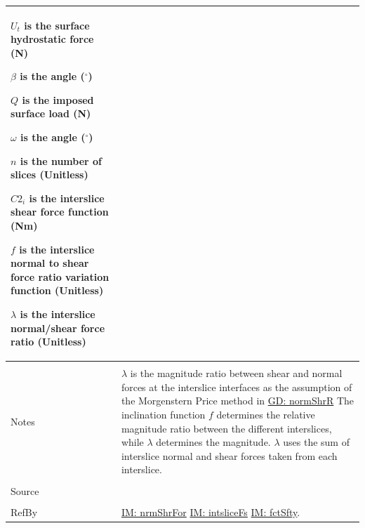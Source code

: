 \documentclass[12pt]{article}
\begin{document}
\begin{minipage}{\textwidth}
\begin{tabular}{p{} p{}}
\begin{symbDescription}
                                                                                           \item{${U_{t}}$ is the surface hydrostatic force (N)}
                                                                                           \item{$β$ is the angle (${}^{\circ}$)}
                                                                                           \item{$Q$ is the imposed surface load (N)}
                                                                                           \item{$ω$ is the angle (${}^{\circ}$)}
                                                                                           \item{$n$ is the number of slices (Unitless)}
                                                                                           \item{${C2_{i}}$ is the interslice shear force function (Nm)}
                                                                                           \item{$f$ is the interslice normal to shear force ratio variation function (Unitless)}
                                                                                           \item{$λ$ is the interslice normal/shear force ratio (Unitless)}
                                                                                           \end{symbDescription}
                                                                                           \\ \midrule \\
                                                                                           Notes & $λ$ is the magnitude ratio between shear and normal forces at the interslice interfaces as the assumption of the Morgenstern Price method in \hyperref[GD:normShrR]{GD: normShrR} The inclination function $f$ determines the relative magnitude ratio between the different interslices, while $λ$ determines the magnitude. $λ$ uses the sum of interslice normal and shear forces taken from each interslice.
                                                                                                   \\ \midrule \\
                                                                                                   Source & \cite{chen2005}
                                                                                                            \\ \midrule \\
                                                                                                            RefBy & \hyperref[IM:nrmShrFor]{IM: nrmShrFor} \hyperref[IM:intsliceFs]{IM: intsliceFs} \hyperref[IM:fctSfty]{IM: fctSfty}.
\\ \bottomrule \end{tabular}
\end{minipage}\\
\end{document}
